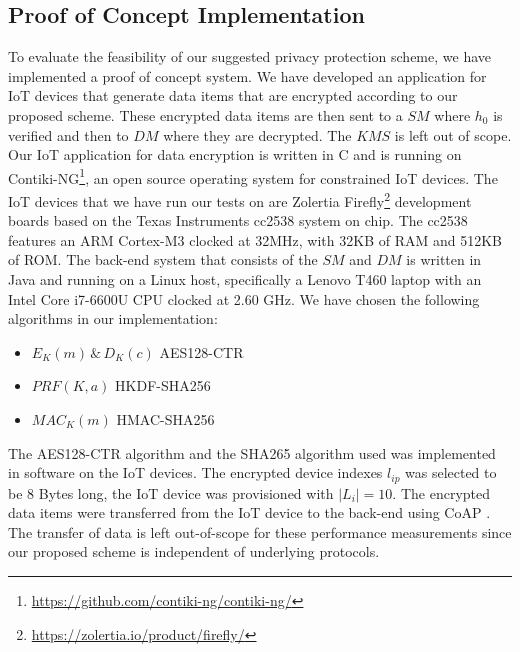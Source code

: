 {\subsection{Proof of Concept Implementation}
To evaluate the feasibility of our suggested privacy protection scheme, we have implemented a proof of concept system. We have developed an application for IoT devices that generate data items that are encrypted according to our proposed scheme. These encrypted data items are then sent to a $SM$ where $h_0$ is verified and then to $DM$ where they are decrypted. The $KMS$ is left out of scope. Our IoT application for data encryption is written in C and is running on Contiki-NG\footnote{\url{https://github.com/contiki-ng/contiki-ng/}}, an open source operating system for constrained IoT devices. 
The IoT devices that we have run our tests on are Zolertia Firefly\footnote{\url{https://zolertia.io/product/firefly/}} development boards based on the Texas Instruments cc2538\cite{instruments2015cc2538} system on chip. The cc2538 features an ARM Cortex-M3 clocked at 32MHz, with 32KB of RAM and 512KB of ROM.  The back-end system that consists of the $SM$ and $DM$ is written in Java and running on a Linux host, specifically a  Lenovo T460 laptop with an Intel Core i7-6600U CPU clocked at 2.60 GHz. 
We have chosen the following algorithms in our implementation:
\begin{itemize}
    \item   $E_K(m)\, \& \, D_K(c)$  AES128-CTR  
    \item  $PRF(K,a)$  HKDF-SHA256 
    \item  $MAC_K(m)$  HMAC-SHA256
\end{itemize}
The AES128-CTR algorithm and the SHA265 algorithm used was implemented in software on the IoT devices. The encrypted device indexes $l_{ip}$ was selected to be 8 Bytes long, the IoT device was provisioned with $|L_i| = 10$. The encrypted data items were transferred from the IoT device to the back-end using CoAP \cite{rfc7252}. The transfer of data is left out-of-scope for these performance measurements since our proposed scheme is independent of underlying protocols. 

}
